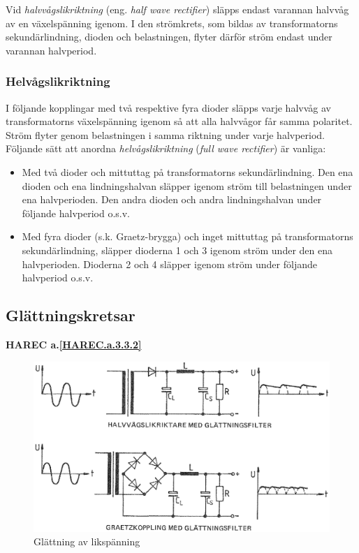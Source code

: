 Vid \emph{halvvågslikriktning} (eng. \emph{half wave rectifier}) släpps endast
varannan halvvåg av en växelspänning igenom. I den strömkrets, som bildas av
transformatorns sekundärlindning, dioden och belastningen, flyter därför ström
endast under varannan halvperiod.

\subsubsection{Helvågslikriktning}

I följande kopplingar med två respektive fyra dioder släpps varje
halvvåg av transformatorns växelspänning igenom så att alla halvvågor
får samma polaritet. Ström flyter genom belastningen i samma riktning
under varje halvperiod. Följande sätt att anordna \emph{helvågslikriktning}
(\emph{full wave rectifier}) är vanliga:
\begin{itemize}
\item Med två dioder och mittuttag på transformatorns
  sekundärlindning. Den ena dioden och ena lindningshalvan släpper
  igenom ström till belastningen under ena halvperioden. Den andra
  dioden och andra lindningshalvan under följande halvperiod o.s.v.

\item Med fyra dioder (s.k. Graetz-brygga) och inget mittuttag på
  transformatorns sekundärlindning, släpper dioderna 1 och 3 igenom
  ström under den ena halvperioden.  Dioderna 2 och 4 släpper igenom
  ström under följande halvperiod o.s.v.
\end{itemize}

\subsection{Glättningskretsar}
\textbf{HAREC a.\ref{HAREC.a.3.3.2}\label{myHAREC.a.3.3.2}}

\begin{figure}
\includegraphics[width=\textwidth]{images/cropped_pdfs/bild_2_3-36.pdf}
\caption{Glättning av likspänning}
\label{fig:BildII3-36}
\end{figure}

